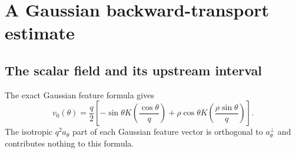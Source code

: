 \documentclass[11pt]{article}
\numberwithin{equation}{section}
\theoremstyle{remark}
\begin{document}
\section{A Gaussian backward-transport estimate}
\label{inc:AN02:arrival:v1:transport}

\subsection{The scalar field and its upstream interval}
The exact Gaussian feature formula gives
\begin{equation}\label{inc:AN02:arrival:v1:vformula}
 v_0(\theta)=\frac q2\left[
 -\sin\theta K\!\left(\frac{\cos\theta}{q}\right)
 +\rho\cos\theta K\!\left(\frac{\rho\sin\theta}{q}\right)
 \right].
\end{equation}
The isotropic $q^2a_\theta$ part of each Gaussian feature vector is
orthogonal to $a_\theta^\perp$ and contributes nothing to this formula.
\end{document}
